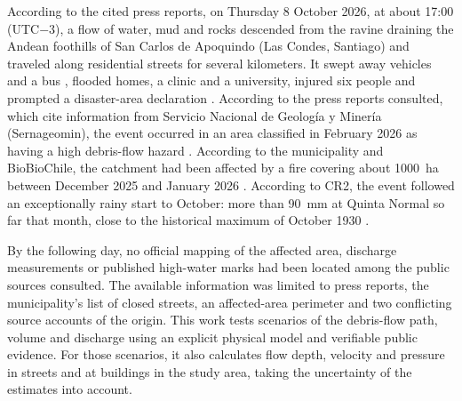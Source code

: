 According to the cited press reports, on Thursday 8 October 2026, at about 17:00 (UTC$-$3), a flow of water, mud and rocks descended from the ravine draining the Andean foothills of San Carlos de Apoquindo (Las Condes, Santiago) and traveled along residential streets for several kilometers. It swept away vehicles and a bus \citep{theclinic2026frontal}, flooded homes, a clinic and a university, injured six people and prompted a disaster-area declaration \citep{interferencia2026}. According to the press reports consulted, which cite information from Servicio Nacional de Geología y Minería (Sernageomin), the event occurred in an area classified in February 2026 as having a high debris-flow hazard \citep{chilevision2026}. According to the municipality and BioBioChile, the catchment had been affected by a fire covering about \SI{1000}{ha} between December 2025 and January 2026 \citep{lascondes2026,biobio2026origen}. According to CR2, the event followed an exceptionally rainy start to October: more than \SI{90}{mm} at Quinta Normal so far that month, close to the historical maximum of October 1930 \citep{cr2_2026}.

By the following day, no official mapping of the affected area, discharge measurements or published high-water marks had been located among the public sources consulted. The available information was limited to press reports, the municipality's list of closed streets, an affected-area perimeter and two conflicting source accounts of the origin. This work tests scenarios of the debris-flow path, volume and discharge using an explicit physical model and verifiable public evidence. For those scenarios, it also calculates flow depth, velocity and pressure in streets and at buildings in the study area, taking the uncertainty of the estimates into account.

